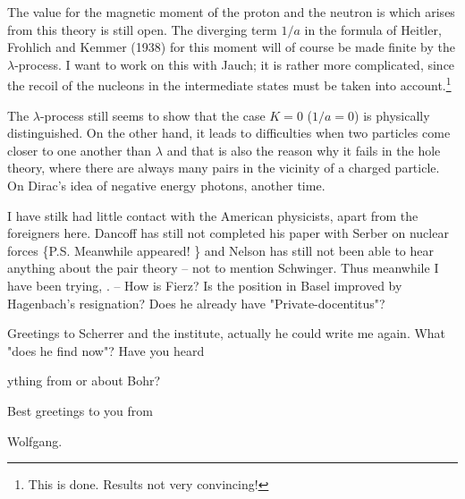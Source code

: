 The value for the magnetic moment of the proton and the neutron is which arises from this theory is still open. The diverging term $1/a$ in the formula of Heitler, Frohlich and Kemmer (1938) for this moment will of course be made finite by the $\lambda$-process. I want to work on this with Jauch; it is rather more complicated, since the recoil of the nucleons in the intermediate states must be taken into account.\footnote{This is done. Results not very convincing!}

The $\lambda$-process still seems to show that the case $K=0$ ($1/a=0$) is physically distinguished. On the other hand, it leads to difficulties when two particles come closer to one another than $\lambda$ and that is also the reason why it fails in the hole theory, where there are always many pairs in the vicinity of a charged particle. On Dirac's idea of negative energy photons, another time.

I have stilk had little contact with the American physicists, apart from the foreigners here. Dancoff has still not completed his paper with Serber on nuclear forces \{P.S. Meanwhile appeared! \} and Nelson has still not been able to hear anything about the pair theory -- not to mention Schwinger. Thus meanwhile I have been trying, . -- How is Fierz? Is the position in Basel improved by Hagenbach's resignation? Does he already have "Private-docentitus"?

Greetings to Scherrer and the institute, actually he could write me again. What "does he find now"? Have you heard 

ything from or about Bohr?

Best greetings to you from

Wolfgang.%